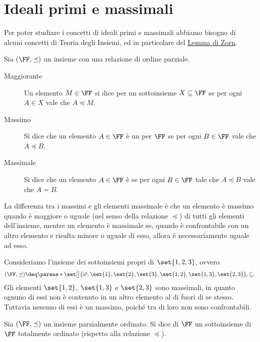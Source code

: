 \section{Ideali primi e massimali}

Per poter studiare i concetti di ideali primi e massimali abbiamo bisogno di alcuni concetti di Teoria degli Insiemi, ed in particolare del \hyperref[lem:Zorn]{Lemma di Zorn}.

\begin{definition}
    Sia $(\FF, \preceq)$ un insieme con una relazione di ordine parziale.
    \begin{description}
        \item[Maggiorante] Un elemento $M \in \FF$ si dice  per un sottoinsieme $X \subseteq \FF$ se per ogni $A \in X$ vale che $A \preceq M$.
        \item[Massimo] Si dice che un elemento $A \in \FF$ è un  per $\FF$ se per ogni $B \in \FF$ vale che $A \preceq B$.
        \item[Massimale] Si dice che un elemento $A \in \FF$ è  se per ogni $B \in \FF$ tale che $A \preceq B$ vale che $A = B$.
    \end{description}
\end{definition}

\begin{remark}
    La differenza tra i massimi e gli elementi massimale è che un elemento è massimo quando è maggiore o uguale (nel senso della relazione $\preceq$) di tutti gli elementi dell'insieme, mentre un elemento è massimale se, quando è confrontabile con un altro elemento e risulta minore o uguale di esso, allora è necessariamente uguale ad esso.
\end{remark}
\begin{example}
    Consideriamo l'insieme dei sottoinsiemi propri di $\set{1, 2, 3}$, ovvero \[
        (\FF, \preceq) \deq \parens*{\set[\big]{\varnothing, \set{1}, \set{2}, \set{3}, \set{1, 2},\set{1, 3}, \set{2, 3}}, \subseteq}.
    \] Gli elementi $\set{1, 2}$, $\set{1, 3}$ e $\set{2, 3}$ sono massimali, in quanto ognuno di essi non è contenuto in un altro elemento al di fuori di se stesso. Tuttavia nessuno di essi è un massimo, poiché tra di loro non sono confrontabili.
\end{example}

\begin{definition}
    [Catena]
    Sia $(\FF, \preceq)$ un insieme parzialmente ordinato. Si dice  di $\FF$ un sottoinsieme di $\FF$ totalmente ordinato (rispetto alla relazione $\preceq$).
\end{definition}

